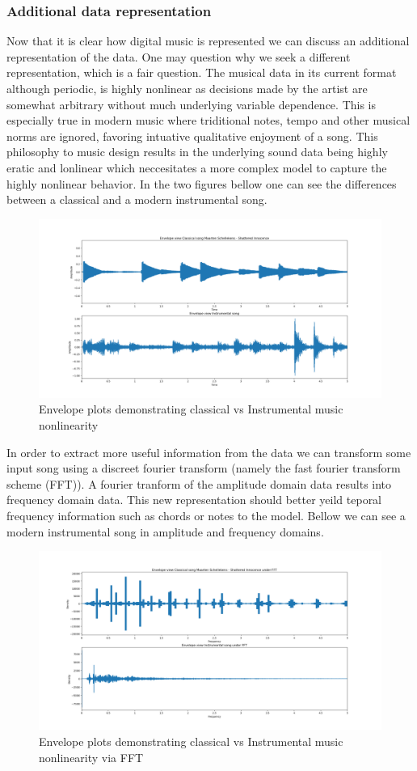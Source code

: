\documentclass{article}
\begin{document}
\subsubsection{Additional data representation}
Now that it is clear how digital music is represented we can discuss an additional representation of the data. One may question why we seek a different representation, which is a fair question. The musical data in its current format although periodic, is highly nonlinear as decisions made by the artist are somewhat arbitrary without much underlying variable dependence. This is especially true in modern music where triditional notes, tempo and other musical norms are ignored, favoring intuative qualitative enjoyment of a song. This philosophy to music design results in the underlying sound data being highly eratic and lonlinear which neccesitates a more complex model to capture the highly nonlinear behavior. In the two figures bellow one can see the differences between a classical and a modern instrumental song.
\begin{figure}[H]
\caption{Envelope plots demonstrating classical vs Instrumental music nonlinearity}
\includegraphics[scale=0.35]{Classical_vs_Instrumental.png}
\end{figure}
In order to extract more useful information from the data we can transform some input song using a discreet fourier transform (namely the fast fourier transform scheme (FFT)). A fourier tranform of the amplitude domain data results into frequency domain data. This new representation should better yeild teporal frequency information such as chords or notes to the model. Bellow we can see a modern instrumental song in amplitude and frequency domains. 
\begin{figure}[H]
\caption{Envelope plots demonstrating classical vs Instrumental music nonlinearity via FFT}
\includegraphics[scale=0.35]{Classical_vs_InstrumentalFFT.png}
\end{figure}
\end{document}
